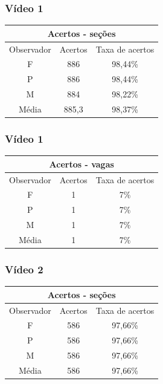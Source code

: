 \documentclass{beamer}
\begin{document}
\begin{frame}
	\frametitle{Vídeo 1}
	
	\begin{center}
\begin{tabular}{|c||c||c|}
\hline
\multicolumn{3}{|c|}{Acertos - seções}  \\ \hline \hline
Observador & Acertos& Taxa de acertos \\ \hline
F & 886 & 98,44\% \\  \hline
P & 886 & 98,44\% \\ \hline
M & 884 & 98,22\% \\ \hline
Média & 885,3 & 98,37\% \\
\hline
\end{tabular}
\end{center}
\end{frame}

\begin{frame}
\frametitle{Vídeo 1}
\begin{center}
\begin{tabular}{|c||c||c|}
\hline
\multicolumn{3}{|c|}{Acertos - vagas}  \\ \hline \hline
Observador & Acertos & Taxa de acertos \\ \hline
F & 1 & 7\% \\  \hline
P & 1 & 7\% \\ \hline
M & 1 & 7\% \\ \hline
Média & 1 & 7\% \\
\hline
\end{tabular}
\end{center}
\end{frame}


\begin{frame}
	\frametitle{Vídeo 2}
	
\begin{center}
\begin{tabular}{|c||c||c|}
\hline
\multicolumn{3}{|c|}{Acertos - seções}  \\ \hline \hline
Observador & Acertos & Taxa de acertos \\ \hline
F & 586 & 97,66\% \\  \hline
P & 586 & 97,66\% \\ \hline
M & 586 & 97,66\% \\ \hline
Média & 586 & 97,66\% \\
\hline
\end{tabular}
\end{center}
\end{frame}
\end{document}
